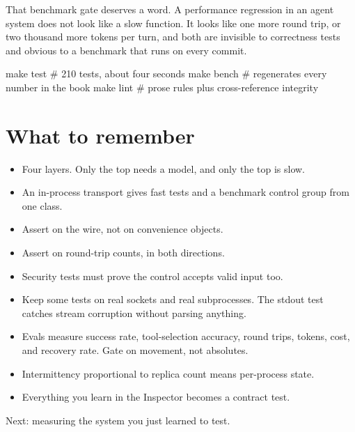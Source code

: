 That benchmark gate deserves a word. A performance regression in an agent system
does not look like a slow function. It looks like one more round trip, or two
thousand more tokens per turn, and both are invisible to correctness tests and
obvious to a benchmark that runs on every commit.

\begin{sh}
make test      # 210 tests, about four seconds
make bench     # regenerates every number in the book
make lint      # prose rules plus cross-reference integrity
\end{sh}

\section{What to remember}

\begin{itemize}[leftmargin=1.6em, itemsep=3pt]
\item Four layers. Only the top needs a model, and only the top is slow.
\item An in-process transport gives fast tests and a benchmark control group
from one class.
\item Assert on the wire, not on convenience objects.
\item Assert on round-trip counts, in both directions.
\item Security tests must prove the control accepts valid input too.
\item Keep some tests on real sockets and real subprocesses. The stdout test
catches stream corruption without parsing anything.
\item Evals measure success rate, tool-selection accuracy, round trips, tokens,
cost, and recovery rate. Gate on movement, not absolutes.
\item Intermittency proportional to replica count means per-process state.
\item Everything you learn in the Inspector becomes a contract test.
\end{itemize}

Next: measuring the system you just learned to test.
